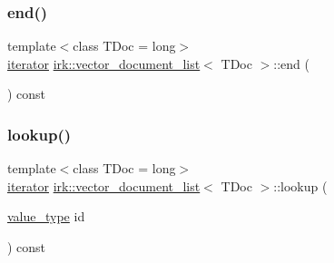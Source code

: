 \mbox{\label{classirk_1_1vector__document__list_adafc0267ab0f84e5240011c96efd9681}} 
\subsubsection{\texorpdfstring{end()}{end()}}
{\footnotesize\ttfamily template$<$class T\+Doc  = long$>$ \\
\mbox{\hyperlink{classirk_1_1vector__document__list_a42499af78a7d66a1b626858cd424600f}{iterator}} \mbox{\hyperlink{classirk_1_1vector__document__list}{irk\+::vector\+\_\+document\+\_\+list}}$<$ T\+Doc $>$\+::end (\begin{DoxyParamCaption}{ }\end{DoxyParamCaption}) const\hspace{0.3cm}{\ttfamily [inline]}}

\mbox{\label{classirk_1_1vector__document__list_af25b19f3edd8c826dea2c2a8523c2772}} 
\subsubsection{\texorpdfstring{lookup()}{lookup()}}
{\footnotesize\ttfamily template$<$class T\+Doc  = long$>$ \\
\mbox{\hyperlink{classirk_1_1vector__document__list_a42499af78a7d66a1b626858cd424600f}{iterator}} \mbox{\hyperlink{classirk_1_1vector__document__list}{irk\+::vector\+\_\+document\+\_\+list}}$<$ T\+Doc $>$\+::lookup (\begin{DoxyParamCaption}\item[{\mbox{\hyperlink{classirk_1_1vector__document__list_a0ec9c56f5e12a3a9101b5a18b2fbe69f}{value\+\_\+type}}}]{id }\end{DoxyParamCaption}) const\hspace{0.3cm}{\ttfamily [inline]}}

\mbox{\label{classirk_1_1vector__document__list_ab2ab2cef0d517240605010570f7765e8}} 
